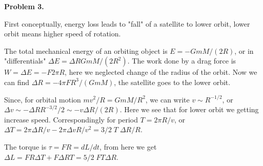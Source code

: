 \documentclass[12pt]{article}
\begin{document}
{\bf Problem 3.}

First conceptually, energy loss leads to "fall" of a satellite to lower orbit, lower orbit means higher
speed of rotation.

The total mechanical energy of an orbiting object is $E=-G m M/(2 R)$, or in "differentials"
$\Delta E= \Delta R G m M/(2 R^2)$. The work done by a drag force is $W=\Delta E=-F 2\pi R$,
here we neglected change of the radius of the orbit. Now we can find $\Delta R =-4\pi F R^3/(G m M )$, the satellite goes to the lower orbit.

Since, for orbital motion $m v^2/R=G m M/R^2$, we can write $v\sim R^{-1/2}$, or 
$\Delta v\sim -\Delta R R^{-3/2}/2 \sim -v\Delta R/(2 R)$. Here we see that for lower orbit we getting
increase speed. Correspondingly for period $T=2\pi R/v$, or $\Delta T= 2\pi \Delta R/v -2\pi \Delta v R/v^2=3/2\; T\;\Delta R/R$.

The torque is $\tau=F R=d L/dt$, from here we get  $\Delta L=F R \Delta T +F \Delta R T=5/2\; FT \Delta R$.
\end{document}
